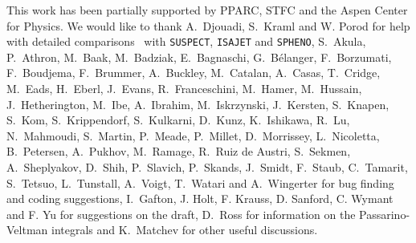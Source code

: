 \documentclass{article}
\begin{document}
\acknowledgments
This work has been partially supported by PPARC, STFC and the Aspen Center for
Physics.
We would like to thank
A.~Djouadi, S.~Kraml and W. Porod 
for help with detailed comparisons~\cite{comparison} with 
{\tt SUSPECT}, {\tt ISAJET} and {\tt SPHENO},
S.~Akula, P.~Athron, M.~Baak, M.~Badziak, E.~Bagnaschi,
G.~B\'elanger, F.~Borzumati, F.~Boudjema, F.~Brummer, A.~Buckley, M.~Catalan,
A.~Casas,  T.~Cridge,
M.~Eads, H.~Eberl, J.~Evans, R.~Franceschini,
M.~Hamer, M.~Hussain,
J.~Hetherington, M.~Ibe, A.~Ibrahim, M.~Iskrzynski, J.~Kersten, S.~Knapen, S.~Kom,
S.~Krippendorf, S.~Kulkarni, D.~Kunz, K.~Ishikawa, 
R.~Lu, N.~Mahmoudi,  S.~Martin, P.~Meade, P.~Millet,
D.~Morrissey, L.~Nicoletta, B.~Petersen,
A.~Pukhov, M.~Ramage,
R.~Ruiz de Austri, 
S.~Sekmen, A.~Sheplyakov, D.~Shih, P.~Slavich, P.~Skands, J.~Smidt, 
F.~Staub, C.~Tamarit, 
S.~Tetsuo, L.~Tunstall, A.~Voigt,
T.~Watari and A.~Wingerter
for bug finding and coding suggestions, I.~Gafton, J. Holt, F. Krauss,
D. Sanford, C. Wymant and F. Yu for
suggestions on the draft, D.~Ross for  
information on the Passarino-Veltman integrals and K.~Matchev for 
other useful discussions. 
\end{document}
